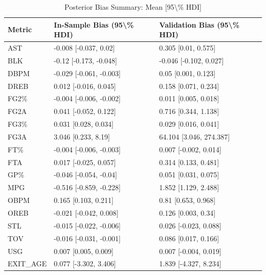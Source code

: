\begin{table}[t]
\caption*{
{\fontsize{20}{25}\selectfont  Posterior Bias Summary: Mean [95\textbackslash{}\% HDI]\fontsize{12}{15}\selectfont }
} 
\fontsize{12.0pt}{14.0pt}\selectfont
\begin{tabular*}{\linewidth}{@{\extracolsep{\fill}}lll}
\toprule
Metric & In-Sample Bias (95\textbackslash{}\% HDI) & Validation Bias (95\textbackslash{}\% HDI) \\ 
\midrule\addlinespace[2.5pt]
AST & -0.008 [-0.037, 0.02] & 0.305 [0.01, 0.575] \\ 
BLK & -0.12 [-0.173, -0.048] & -0.046 [-0.102, 0.027] \\ 
DBPM & -0.029 [-0.061, -0.003] & 0.05 [0.001, 0.123] \\ 
DREB & 0.012 [-0.016, 0.045] & 0.158 [0.071, 0.234] \\ 
FG2\% & -0.004 [-0.006, -0.002] & 0.011 [0.005, 0.018] \\ 
FG2A & 0.041 [-0.052, 0.122] & 0.716 [0.344, 1.138] \\ 
FG3\% & 0.031 [0.028, 0.034] & 0.029 [0.016, 0.041] \\ 
FG3A & 3.046 [0.233, 8.19] & 64.104 [3.046, 274.387] \\ 
FT\% & -0.004 [-0.006, -0.003] & 0.007 [-0.002, 0.014] \\ 
FTA & 0.017 [-0.025, 0.057] & 0.314 [0.133, 0.481] \\ 
GP\% & -0.046 [-0.054, -0.04] & 0.051 [0.031, 0.075] \\ 
MPG & -0.516 [-0.859, -0.228] & 1.852 [1.129, 2.488] \\ 
OBPM & 0.165 [0.103, 0.211] & 0.81 [0.653, 0.968] \\ 
OREB & -0.021 [-0.042, 0.008] & 0.126 [0.003, 0.34] \\ 
STL & -0.015 [-0.022, -0.006] & 0.026 [-0.023, 0.088] \\ 
TOV & -0.016 [-0.031, -0.001] & 0.086 [0.017, 0.166] \\ 
USG & 0.007 [0.005, 0.009] & 0.007 [-0.004, 0.019] \\ 
EXIT\_AGE & 0.077 [-3.302, 3.406] & 1.839 [-4.327, 8.234] \\ 
\bottomrule
\end{tabular*}
\end{table}

